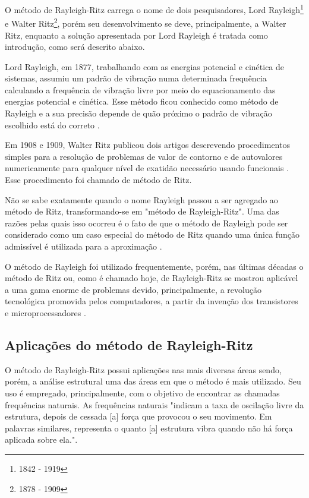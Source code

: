 \documentclass[
	12pt,				%
	openright,			%
    twoside,			%
	a4paper,			%
	chapter=TITLE,		%
	english,			%
	french,				%
	spanish,			%
	brazil				%
	]{abntex2}
\numberwithin{lema}{chapter}
\numberwithin{teorema}{chapter}
\numberwithin{definicao}{chapter}
\numberwithin{exemplo}{chapter}
\numberwithin{figure}{chapter}
\newcommand{\bdDate}[2]{\footnote{\gtrsymBorn\text{ }#1 - \gtrsymDied\text{ }#2}}
\begin{document}
O método de Rayleigh-Ritz carrega o nome de dois pesquisadores, Lord Rayleigh\bdDate{1842}{1919} e Walter Ritz\bdDate{1878}{1909}, porém seu desenvolvimento se deve, principalmente, a Walter Ritz, enquanto a solução apresentada por Lord Rayleigh é tratada como introdução, como será descrito abaixo.

Lord Rayleigh, em 1877, trabalhando com as energias potencial e cinética de sistemas, assumiu um padrão de vibração numa determinada frequência calculando a frequência de vibração livre por meio do equacionamento das energias potencial e cinética. Esse método ficou conhecido como método de Rayleigh e a sua precisão depende de quão próximo o padrão de vibração escolhido está do correto \cite{LEISSA_2005}.

Em 1908 e 1909, Walter Ritz publicou dois artigos descrevendo procedimentos simples para a resolução de problemas de valor de contorno e de autovalores numericamente para qualquer nível de exatidão necessário usando funcionais \cite{LEISSA_2005}. Esse procedimento foi chamado de método de Ritz.

Não se sabe exatamente quando o nome Rayleigh passou a ser agregado ao método de Ritz, transformando-se em "método de Rayleigh-Ritz". Uma das razões pelas quais isso ocorreu é o fato de que o método de Rayleigh pode ser considerado como um caso especial do método de Ritz quando uma única função admissível é utilizada para a aproximação \cite{LEISSA_2005}.

O método de Rayleigh foi utilizado frequentemente, porém, nas últimas décadas o método de Ritz ou, como é chamado hoje, de Rayleigh-Ritz se mostrou aplicável a uma gama enorme de problemas devido, principalmente, a revolução tecnológica promovida pelos computadores, a partir da invenção dos transistores e microprocessadores \cite{LEISSA_2005}.

\subsection{Aplicações do método de Rayleigh-Ritz}

O método de Rayleigh-Ritz possui aplicações nas mais diversas áreas sendo, porém, a análise estrutural uma das áreas em que o método é mais utilizado. Seu uso é empregado, principalmente, com o objetivo de encontrar as chamadas frequências naturais. As frequências naturais "indicam a taxa de oscilação livre da estrutura, depois de cessada [a] força que provocou o seu movimento. Em palavras similares, representa o quanto [a] estrutura vibra quando não há força aplicada sobre ela."\text{ }\cite[p. 1]{Vasquez2015}.
\end{document}
